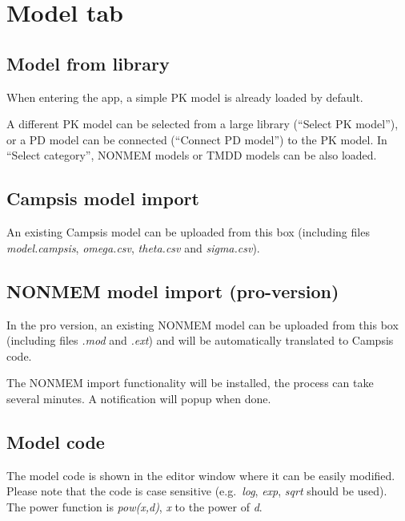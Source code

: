 \documentclass[
]{book}
\begin{document}
\hypertarget{model-tab}{%
\chapter{Model tab}\label{model-tab}}

\hypertarget{model-from-library}{%
\section{Model from library}\label{model-from-library}}

When entering the app, a simple PK model is already loaded by default.

A different PK model can be selected from a large library (``Select PK model''), or a PD model can be connected (``Connect PD model'') to the PK model. In ``Select category'', NONMEM models or TMDD models can be also loaded.

\hypertarget{campsis-model-import}{%
\section{Campsis model import}\label{campsis-model-import}}

An existing Campsis model can be uploaded from this box (including files \emph{model.campsis}, \emph{omega.csv}, \emph{theta.csv} and \emph{sigma.csv}).

\hypertarget{nonmem-model-import-pro-version}{%
\section{NONMEM model import (pro-version)}\label{nonmem-model-import-pro-version}}

In the pro version, an existing NONMEM model can be uploaded from this box (including files \emph{.mod} and \emph{.ext}) and will be automatically translated to Campsis code.

The NONMEM import functionality will be installed, the process can take several minutes. A notification will popup when done.

\hypertarget{model-code}{%
\section{Model code}\label{model-code}}

The model code is shown in the editor window where it can be easily modified. Please note that the code is case sensitive (e.g.~\emph{log}, \emph{exp}, \emph{sqrt} should be used). The power function is \emph{pow(x,d)}, \emph{x} to the power of \emph{d}.
\end{document}
